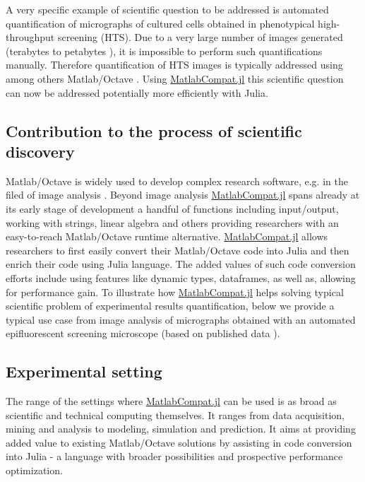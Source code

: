 A very specific example of scientific question to be addressed is automated quantification of micrographs of cultured cells obtained in phenotypical high-throughput screening (HTS). Due to a very large number of images generated (terabytes to petabytes \cite{R_m__2014}), it is impossible to perform such quantifications manually. Therefore quantification of HTS images is typically addressed using among others Matlab/Octave \cite{22787215, 17076895, R_m__2014}. Using \href{https://github.com/MatlabCompat/MatlabCompat.jl}{MatlabCompat.jl} this scientific question can now be addressed potentially more efficiently with Julia.

\subsection{Contribution to the process of scientific discovery}

Matlab/Octave is widely used to develop complex research software, e.g. in the filed of image analysis \cite{Kiss_2014, 17076895}. Beyond image analysis \href{https://github.com/MatlabCompat/MatlabCompat.jl}{MatlabCompat.jl} spans already at its early stage of development a handful of functions including input/output, working with strings, linear algebra and others providing researchers with an easy-to-reach Matlab/Octave runtime alternative. \href{https://github.com/MatlabCompat/MatlabCompat.jl}{MatlabCompat.jl} allows researchers to first easily convert their Matlab/Octave code into Julia and then enrich their code using Julia language. The added values of such code conversion efforts include using features like dynamic types, dataframes, as well as, allowing for performance gain. To illustrate how \href{https://github.com/MatlabCompat/MatlabCompat.jl}{MatlabCompat.jl} helps solving typical scientific problem of experimental results quantification, below we provide a typical use case from image analysis of micrographs obtained with an automated epifluorescent screening microscope (based on published data \cite{22787215}).

\subsection{Experimental setting}

The range of the settings where \href{https://github.com/MatlabCompat/MatlabCompat.jl}{MatlabCompat.jl} can be used is as broad as scientific and technical computing themselves. It ranges from data acquisition, mining and analysis to modeling, simulation and prediction. It aims at providing added value to existing Matlab/Octave solutions by assisting in code conversion into Julia - a language with broader possibilities and prospective performance optimization.

